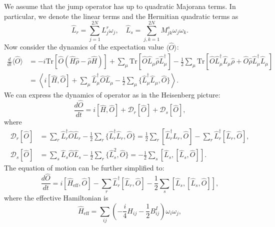 \documentclass[aps,prb,superscriptaddress,nofootinbib]{revtex4}
\begin{document}
We assume that the jump operator has up to quadratic Majorana terms. 
In particular, we denote the linear terms and the Hermitian quadratic terms as
\begin{equation}
	\hat L_r = \sum_{j=1}^{2N} L^r_{j} \omega_j, \quad
	\hat L_s = \sum_{j,k=1}^{2N} M^s_{jk} \omega_j \omega_k.
\end{equation}
Now consider the dynamics of the expectation value $\langle\hat O\rangle$:
\begin{equation}
\begin{aligned}
	\frac{d}{dt}\langle \hat O\rangle
	&= -i \mathrm{Tr} [\hat O (\hat H \hat\rho-\hat\rho \hat H)] 
		+ \sum_\mu \mathrm{Tr}[\hat O \hat L_\mu \hat\rho \hat L_\mu^\dagger]
		- \frac{1}{2}\sum_\mu \mathrm{Tr}[\hat O \hat L_\mu^\dagger \hat L_\mu \hat\rho
		+ \hat O \hat\rho \hat L_\mu^\dagger \hat L_\mu] \\
	&= \left\langle
		i[\hat H, \hat O] + \sum_\mu \hat L_\mu^\dagger \hat O\hat L_\mu - \frac{1}{2} \sum_\mu\{\hat L_\mu^\dagger \hat L_\mu, \hat O \}
		\right\rangle.
\end{aligned}
\end{equation}
We can express the dynamics of operator as in the Heisenberg picture:
\begin{equation}
	\frac{d\hat O}{dt} = i[\hat H, \hat O] + \mathcal D_r[\hat O] + \mathcal D_s[\hat O],
\end{equation}
where
\begin{equation}
\begin{aligned}
	\mathcal D_r[\hat O] 
	&= \sum_r \hat L_r^\dagger \hat O\hat L_r - \frac{1}{2} \sum_r\{\hat L_r^\dagger \hat L_r, \hat O \}
	= \frac{1}{2}\sum_r [\hat L_r^\dagger L_r, \hat O] - \sum_r \hat L_r^\dagger[\hat L_r,\hat O],  \\
	\mathcal D_s[\hat O] 
	&= \sum_s \hat L_s \hat O\hat L_s - \frac{1}{2} \sum_r\{\hat L_s^2, \hat O \}
	= -\frac{1}{2} \sum_s [\hat L_s,[\hat L_s,\hat O]].
\end{aligned}
\end{equation}
The equation of motion can be further simplified to:
\begin{equation}
	\frac{d\hat O}{dt} 
	= i[\hat H_{\mathrm{eff}}, \hat O] - \sum_r \hat L_r^\dagger[\hat L_r,\hat O] -\frac{1}{2} \sum_s [\hat L_s,[\hat L_s,\hat O]],
\end{equation}
where the effective Hamiltonian is
\begin{equation}
	\hat H_{\mathrm{eff}} = \sum_{ij} \left(-\frac{i}{4}H_{ij}-\frac{1}{2} B^I_{ij}\right)\omega_i\omega_j,
\end{equation}
\end{document}
